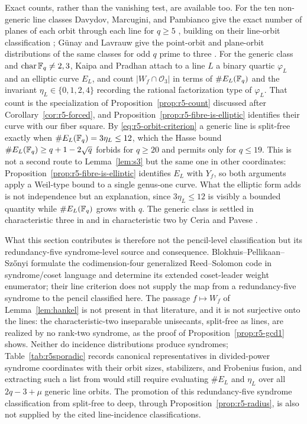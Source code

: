 \begin{remark}
Exact counts, rather than the vanishing test, are available too.  For
the ten non-generic line classes Davydov, Marcugini, and Pambianco give
the exact number of planes of each orbit through each line for
$q\geq5$ \cite[Thm.~3.3]{DMP2022}, building on their line-orbit
classification \cite{DMP2023,DMP2021}; G\"unay and Lavrauw give the
point-orbit and plane-orbit distributions of the same classes for odd
$q$ prime to three \cite{GunayLavrauw2022}.  For the generic class and
$\operatorname{char}\mathbb F_q\neq2,3$, Kaipa and Pradhan attach to a line
$L$ a binary quartic $\varphi_L$ and an elliptic curve $E_L$, and count
$|W_f\cap\mathcal O_3|$ in terms of $\#E_L(\mathbb F_q)$ and the invariant
$\eta_L\in\{0,1,2,4\}$ recording the rational factorization type of
$\varphi_L$.  That count is the specialization of
Proposition~\ref{prop:r5-count} discussed after
Corollary~\ref{cor:r5-forced}, and
Proposition~\ref{prop:r5-fibre-is-elliptic} identifies their curve with
our fiber square.  By \eqref{eq:r5-orbit-criterion} a generic line is
split-free exactly when $\#E_L(\mathbb F_q)=3\eta_L\leq12$, which the Hasse
bound $\#E_L(\mathbb F_q)\geq q+1-2\sqrt q$ forbids for $q\geq20$ and permits
only for $q\leq19$.  This is not a second route to
Lemma~\ref{lem:s3} but the same one in other coordinates:
Proposition~\ref{prop:r5-fibre-is-elliptic} identifies $E_L$ with $Y_f$,
so both arguments apply a Weil-type bound to a single genus-one curve.
What the elliptic form adds is not independence but an explanation, since
$3\eta_L\leq12$ is visibly a bounded quantity while $\#E_L(\mathbb F_q)$ grows
with $q$.  The generic class is settled in
characteristic three in \cite{KaipaPradhan2025char3} and in
characteristic two by Ceria and Pavese \cite{CeriaPavese2023}.

What this section contributes is therefore not the pencil-level
classification but its redundancy-five syndrome-level source and
consequence.  Blokhuis--Pellikaan--Sz\H onyi formulate the
codimension-four generalized Reed--Solomon code in syndrome/coset
language and determine its extended coset-leader weight enumerator;
their line criterion does not supply the map from a redundancy-five
syndrome to the pencil classified here.  The
passage $f\mapsto W_f$ of Lemma~\ref{lem:hankel} is not present in that
literature, and it is not surjective onto the lines: the
characteristic-two inseparable unisecants, split-free as lines, are
realized by no rank-two syndrome, as the proof of
Proposition~\ref{prop:r5-gcd1} shows.  Neither do incidence
distributions produce syndromes; Table~\ref{tab:r5sporadic} records
canonical representatives in divided-power syndrome coordinates with
their orbit sizes, stabilizers, and Frobenius fusion, and extracting
such a list from \cite[Prop.~4.5 and Thm.~5.1]{KaipaPradhan2025} would still require
evaluating $\#E_L$ and $\eta_L$ over all $2q-3+\mu$ generic line orbits.
The promotion of this redundancy-five syndrome classification from
split-free to deep, through Proposition~\ref{prop:r5-radius}, is also
not supplied by the cited line-incidence classifications.
\end{remark}

